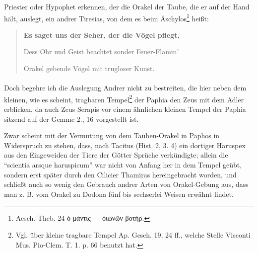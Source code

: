 \documentclass[a4paper, 11pt, oneside, polutonikogreek, german]{article}
\begin{document}
Priester oder Hypophet erkennen, der die Orakel der Taube, die er auf der Hand hält, auslegt, ein andrer Tiresias, von dem es beim Äschylos\footnote{Aesch. Theb. 24 ὁ μάντις --- ὀιωνῶν βοτήρ.} heißt:
\begin{quotation}\small\bfseries
Es saget uns der Seher, der die Vögel pflegt,  

Dess Ohr und Geist beachtet sonder Feuer-Flamm'

Orakel gebende Vögel mit trugloser Kunst.
\end{quotation}
\paragraph{}
Doch begehre ich die Auslegung Andrer nicht zu bestreiten, die hier neben dem kleinen, wie es scheint, tragbaren Tempel\footnote{Vgl. über kleine tragbare Tempel Ap. Gesch. 19, 24 ff., welche Stelle Visconti Mus. Pio-Clem. T. 1. p. 66 benutzt hat.} der Paphia den Zeus mit dem Adler erblicken, da auch Zeus Serapis vor einem ähnlichen kleinen Tempel der Paphia sitzend auf der Gemme 2., 16 vorgestellt ist.

Zwar scheint mit der Vermutung von dem Tauben-Orakel in Paphos in Widerspruch zu stehen, dass, nach Tacitus (Hist. 2, 3. 4) ein dortiger Haruspex aus den Eingeweiden der Tiere der Götter Sprüche verkündigte; allein die "`scientia arsque haruspicum"' war nicht von Anfang her in dem Tempel geübt, sondern erst später durch den Cilicier Thamiras hereingebracht worden, und schließt auch so wenig den Gebrauch andrer Arten von Orakel-Gebung aus, dass man z. B. vom Orakel zu Dodona fünf bis sechserlei Weisen erwähnt findet.
\end{document}

